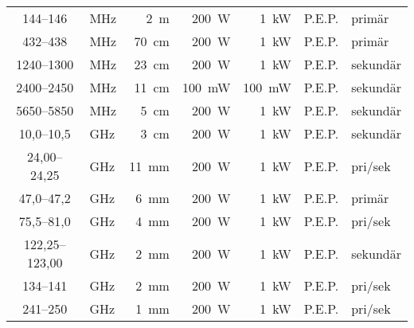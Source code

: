 \begin{table*}[b!]
\begin{tabular}{clr|rrl|l}
144--146 & MHz & 2~m & 200~W & 1~kW & P.E.P. & primär\\
432--438 & MHz & 70~cm & 200~W & 1~kW & P.E.P. & primär\\
1240--1300 & MHz & 23~cm & 200~W & 1~kW & P.E.P. & sekundär\\
2400--2450 & MHz & 11~cm & 100~mW & 100~mW & P.E.P. & sekundär\\
5650--5850 & MHz & 5~cm & 200~W & 1~kW & P.E.P. & sekundär\\
10,0--10,5 & GHz & 3~cm & 200~W & 1~kW & P.E.P. & sekundär\\
24,00--24,25 & GHz & 11~mm & 200~W & 1~kW & P.E.P. & pri/sek\\
47,0--47,2 & GHz & 6~mm & 200~W & 1~kW & P.E.P. & primär\\
75,5--81,0 & GHz & 4~mm & 200~W & 1~kW & P.E.P. & pri/sek\\
122,25--123,00 & GHz & 2~mm & 200~W & 1~kW & P.E.P. & sekundär\\
134--141 & GHz & 2~mm & 200~W & 1~kW & P.E.P. & pri/sek\\
241--250 & GHz & 1~mm & 200~W & 1~kW & P.E.P. & pri/sek\\
\end{tabular}
\end{table*}

